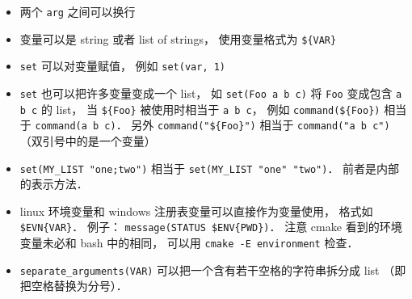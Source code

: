 \begin{itemize}
\item 两个 \verb`arg` 之间可以换行
\item 变量可以是 string 或者 list of strings， 使用变量格式为 \verb`${VAR}`
\item \verb`set` 可以对变量赋值， 例如 \verb`set(var, 1)`
\item \verb`set` 也可以把许多变量变成一个 list， 如 \verb`set(Foo a b c)` 将 \verb`Foo` 变成包含 \verb`a b c` 的 list， 当 \verb`${Foo}` 被使用时相当于 \verb`a b c`， 例如 \verb`command(${Foo})` 相当于 \verb`command(a b c)`． 另外 \verb`command("${Foo}")` 相当于 \verb`command("a b c")` （双引号中的是一个变量）
\item \verb|set(MY_LIST "one;two")| 相当于 \verb|set(MY_LIST "one" "two")|． 前者是内部的表示方法．
\item linux 环境变量和 windows 注册表变量可以直接作为变量使用， 格式如 \verb`$EVN{VAR}`． 例子： \verb|message(STATUS $ENV{PWD})|． 注意 cmake 看到的环境变量未必和 bash 中的相同， 可以用 \verb`cmake -E environment` 检查．
\item \verb|separate_arguments(VAR)| 可以把一个含有若干空格的字符串拆分成 list （即把空格替换为分号）．
\end{itemize}

